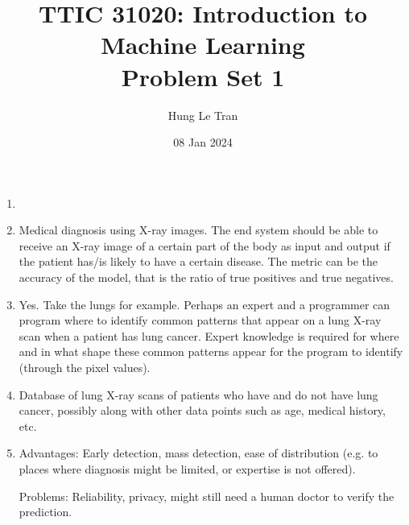 \documentclass[a4paper, 12pt]{article}
\title{TTIC 31020: Introduction to Machine Learning \\ \large Problem Set 1}
\date{08 Jan 2024}
\author{Hung Le Tran}
\begin{document}
\maketitle
\setcounter{section}{1}
\begin{problem} [Problem 1]
\end{problem}
\begin{solution}
    \begin{enumerate}
    \item[]
    \item Medical diagnosis using X-ray images. The end system should be able to receive an X-ray image of a certain part of the body as input and output if the patient has/is likely to have a certain disease. The metric can be the accuracy of the model, that is the ratio of true positives and true negatives.
    
    \item Yes. Take the lungs for example. Perhaps an expert and a programmer can program where to identify common patterns that appear on a lung X-ray scan when a patient has lung cancer. Expert knowledge is required for where and in what shape these common patterns appear for the program to identify (through the pixel values).
    
    \item Database of lung X-ray scans of patients who have and do not have lung cancer, possibly along with other data points such as age, medical history, etc.
    
    \item Advantages: Early detection, mass detection, ease of distribution (e.g. to places where diagnosis might be limited, or expertise is not offered).
    
    Problems: Reliability, privacy, might still need a human doctor to verify the prediction.
    \end{enumerate}
\end{solution}
\end{document}
